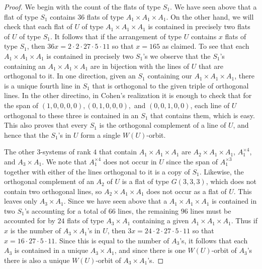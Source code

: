 \documentclass[11pt, reqno]{amsart}
\numberwithin{equation}{section}
\theoremstyle{definition}
\theoremstyle{plain}
\begin{document}
\begin{proof}
We begin with the count of the flats of type $S_1$. We have seen above that a flat of type $S_1$ contains $36$ flats of type $A_1 \times A_1 \times A_1$. On the other hand, we will check that each flat of $U$ of type $A_1 \times A_1 \times A_1$ is contained in precisely two flats of $U$ of type $S_1$. It follows that if the arrangement of type $U$ contains $x$ flats of type $S_1$, then $36x=2 \cdot 2 \cdot 27 \cdot 5 \cdot 11$ so that $x=165$ as claimed. To see that each $A_1 \times A_1 \times A_1$ is contained in precisely two $S_1$'s we observe that the $S_1$'s containing an $A_1 \times A_1 \times A_1$ are in bijection with the lines of $U$ that are orthogonal to it. In one direction, given an $S_1$ containing our $A_1 \times A_1 \times A_1$, there is a unique fourth line in $S_1$ that is orthogonal to the given triple of orthogonal lines. In the other directino, in Cohen's realization it is enough to check that for the span of $(1,0,0,0,0), (0,1,0,0,0),$ and $(0,0,1,0,0)$, each line of $U$ orthogonal to these three is contained in an $S_1$ that contains them, which is easy. This also proves that every $S_1$ is the orthogonal complement of a line of $U$, and hence that the $S_1$'s in $U$ form a single $W(U)$-orbit.

The other $3$-systems of rank $4$ that contain $A_1 \times A_1 \times A_1$ are $A_2 \times A_1 \times A_1$, $A_1^{\times 4}$, and $A_3 \times A_1$. We note that $A_1^{\times 4}$ does not occur in $U$ since the span of $A_1^{\times 3}$ together with either of the lines orthogonal to it is a copy of $S_1$. Likewise, the orthogonal complement of an $A_2$ of $U$ is a flat of type $G(3,3,3)$, which does not contain two orthogonal lines, so $A_2 \times A_1 \times A_1$ does not occur as a flat of $U$. This leaves only $A_3 \times A_1$. Since we have seen above that a $A_1 \times A_1 \times A_1$ is contained in two $S_1$'s accounting for a total of $66$ lines, the remaining $96$ lines must be accounted for by $24$ flats of type $A_3 \times A_1$ containing a given $A_1 \times A_1 \times A_1$. Thus if $x$ is the number of $A_3 \times A_1$'s in $U$, then $3x=24 \cdot 2 \cdot 27 \cdot 5 \cdot 11$ so that $x=16 \cdot 27 \cdot 5 \cdot 11$. Since this is equal to the number of $A_3$'s, it follows that each $A_3$ is contained in a unique $A_3 \times A_1$, and since there is one $W(U)$-orbit of $A_3$'s there is also a unique $W(U)$-orbit of $A_3 \times A_1$'s. 


\end{proof}
\end{document}
